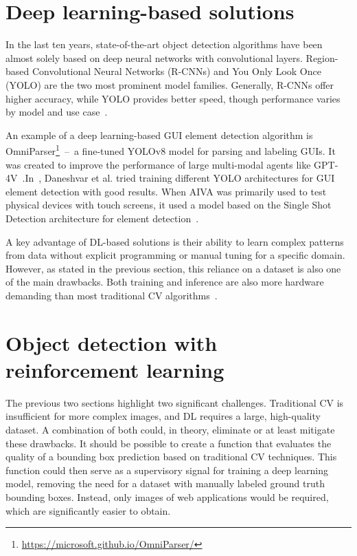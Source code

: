 \documentclass[
  digital,     %
  oneside,     %
  nosansbold,  %
  nocolorbold, %
  lof,         %
  lot,         %
]{fithesis4}
\begin{document}
\section{Deep learning-based solutions}
In the last ten years, state-of-the-art object detection algorithms have been almost solely based on deep neural networks with convolutional layers. Region-based Convolutional Neural Networks (R-CNNs) and You Only Look Once (YOLO) are the two most prominent model families. Generally, R-CNNs offer higher accuracy, while YOLO provides better speed, though performance varies by model and use case~\cite{ObjectDetectionHistorySurvey}.

An example of a deep learning-based GUI element detection algorithm is OmniParser\footnote{\url{https://microsoft.github.io/OmniParser/}}~--~a fine-tuned YOLOv8 model for parsing and labeling GUIs. It was created to improve the performance of large multi-modal agents like GPT-4V~\cite{OmniParser}.In~\cite{GUI_YOLO_comparison}, Daneshvar et al. tried training different YOLO architectures for GUI element detection with good results. When AIVA was primarily used to test physical devices with touch screens, it used a model based on the Single Shot Detection architecture for element detection~\cite{Horak2020thesis}.

A key advantage of DL-based solutions is their ability to learn complex patterns from data without explicit programming or manual tuning for a specific domain. However, as stated in the previous section, this reliance on a dataset is also one of the main drawbacks. Both training and inference are also more hardware demanding than most traditional CV algorithms~\cite{DLvsTCV}.

\section{Object detection with reinforcement learning}

The previous two sections highlight two significant challenges. Traditional CV is insufficient for more complex images, and DL requires a large, high-quality dataset. A combination of both could, in theory, eliminate or at least mitigate these drawbacks. It should be possible to create a function that evaluates the quality of a bounding box prediction based on traditional CV techniques. This function could then serve as a supervisory signal for training a deep learning model, removing the need for a dataset with manually labeled ground truth bounding boxes. Instead, only images of web applications would be required, which are significantly easier to obtain.
\end{document}
